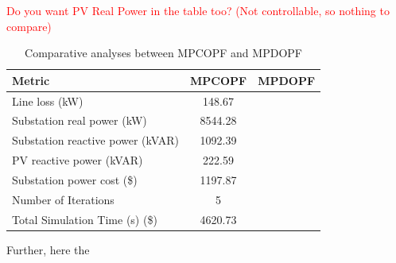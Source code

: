 \documentclass[../../outputs/main.tex]{subfiles}
\begin{document}

\textcolor{red}{Do you want PV Real Power in the table too? (Not controllable, so nothing to compare)}

\begin{table}[h!]
    \centering
    \caption{Comparative analyses between MPCOPF and MPDOPF}
    \begin{tabular}{|l|c|c|}
    \hline
    \textbf{Metric} & \textbf{MPCOPF} & \textbf{MPDOPF} \\ \hline
    Line loss (kW) & 148.67 &  \\ \hline
    Substation real power (kW) & 8544.28 &   \\ \hline
    Substation reactive power (kVAR) & 1092.39 &   \\ \hline
    PV reactive power (kVAR) & 222.59 &   \\ \hline
    Substation power cost (\$) & 1197.87 &   \\ \hline
    Number of Iterations & 5 &   \\ \hline
    Total Simulation Time (s) (\$) & 4620.73 &   \\ \hline
    \end{tabular}
    \label{table:opt-10-20-30}
\end{table}


Further, here the 
\end{document}
